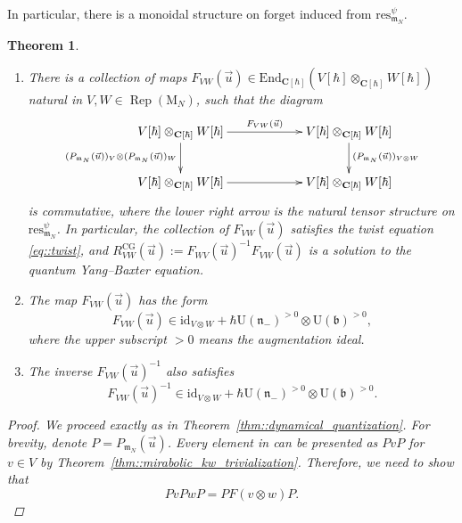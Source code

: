 \documentclass[10pt,a4paper]{article}
\numberwithin{equation}{section}
\newtheorem{Theorem}{Theorem}[section]
\newcommand{\CG}{\mathrm{CG}}
\newcommand{\C}{\mathbf{C}}
\newcommand{\U}{\mathrm{U}_{\hbar}}
\newcommand{\rM}{\mathrm{M}}
\renewcommand{\b}{\mathfrak{b}}
\newcommand{\n}{\mathfrak{n}}
\newcommand{\m}{\mathfrak{m}}
\newcommand{\End}{\mathrm{End}}
\newcommand{\forget}{\mathrm{forget}}
\newcommand{\id}{\mathrm{id}}
\DeclareMathOperator{\Rep}{Rep}
\newcommand{\res}{\mathrm{res}}
\begin{document}
	
	In particular, there is a monoidal structure on $\forget$ induced from $\res_{\m_N}^{\psi}$.
	\begin{Theorem}\quad
		\label{thm::mirabolic_tensor_structure}
		\begin{enumerate}\itemsep=0pt
			\item[$(1)$] There is a collection of maps $F_{VW}(\vec{u})\in \End_{\C[\hbar]}(V[\hbar] \otimes_{\C[\hbar]} W[\hbar])$ natural in $V,W\in \Rep(\rM_N)$, such that the diagram
			\[
			\xymatrixcolsep{5pc}\xymatrix{
				V[\hbar] \otimes_{\C[\hbar]} W[\hbar] \ar[r]^{F_{VW}(\vec{u})} \ar[d]_{(P_{\m_N}(\vec{u}))_V \otimes (P_{\m_N}(\vec{u}))_W} & V[\hbar] \otimes_{\C[\hbar]} W[\hbar] \ar[d]^{(P_{\m_N}(\vec{u}))_{V\otimes W}} \\
				V[\hbar] \otimes_{\C[\hbar]} W[\hbar] \ar[r] & V[\hbar] \otimes_{\C[\hbar]} W[\hbar]
			}
			\]
			is commutative, where the lower right arrow is the natural tensor structure on $\res_{\m_N}^{\psi}$. In particular, the collection of $F_{VW}(\vec{u})$ satisfies the twist equation \eqref{eq::twist}, and $R^{\CG}_{VW} (\vec{u}):= F_{WV}(\vec{u})^{-1} F_{VW}(\vec{u})$ is a solution to the quantum Yang--Baxter equation.
			\item[$(2)$] The map $F_{VW}(\vec{u})$ has the form
			\[
			F_{VW} (\vec{u})\in \id_{V\otimes W} + \hbar \mathrm{U}(\n_-)^{>0} \otimes \mathrm{U}(\b)^{>0},
			\]
			where the upper subscript $>0$ means the augmentation ideal.
			\item[$(3)$] The inverse $F_{VW}(\vec{u})^{-1}$ also satisfies
			\[
			F_{VW}(\vec{u})^{-1} \in \id_{V\otimes W} + \hbar \mathrm{U}(\n_-)^{>0} \otimes \mathrm{U}(\b)^{>0}.
			\]
		\end{enumerate}
		\begin{proof}
			We proceed exactly as in Theorem~\ref{thm::dynamical_quantization}. For brevity, denote $P = P_{\m_N}(\vec{u})$. Every element in \smash{$\bigl(\n_-^{\psi} \backslash V\otimes \U(\m_N) \bigr)^{N_-}$} can be presented as $PvP$ for $v\in V$ by Theorem~\ref{thm::mirabolic_kw_trivialization}. Therefore, we need to show that
			\begin{equation}
				\label{eq::middle_p_twist}
				PvPwP = PF(v\otimes w) P.
			\end{equation}
			

\end{proof}
\end{Theorem}
\end{document}
